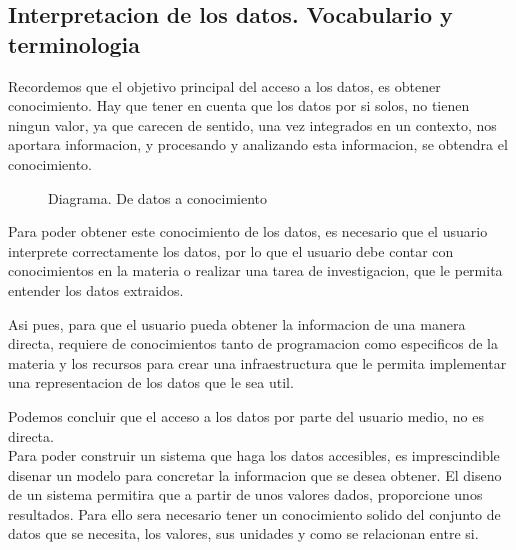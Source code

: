 \subsection{Interpretacion de los datos. Vocabulario y terminologia}

Recordemos que el objetivo principal del acceso a los datos, es obtener conocimiento. Hay que tener en 
cuenta que los datos por si solos, no tienen ningun valor, ya que carecen de sentido, una vez integrados en un contexto,
nos aportara informacion, y procesando y analizando esta informacion, se obtendra el conocimiento.\\
    
\begin{figure}[ht]
    \centering 
      \caption{Diagrama. De datos a conocimiento}
    \end{figure}
 
Para poder obtener este conocimiento de los datos, es necesario que el usuario interprete correctamente los datos, por lo
que el usuario debe contar con conocimientos en la materia o realizar una tarea de investigacion, que le permita 
entender los datos extraidos. 

Asi pues, para que el usuario pueda obtener la informacion de una manera directa, requiere de conocimientos tanto 
de programacion como especificos de la materia y los recursos para crear una infraestructura que le permita implementar 
una representacion de los datos que le sea util.

Podemos concluir que el acceso a los datos por parte del usuario medio, no es directa.\\

Para poder construir un sistema que haga los datos accesibles, es imprescindible disenar un modelo  para concretar la 
informacion que se desea obtener. El diseno de un sistema permitira que a partir de unos valores dados, proporcione unos resultados.
Para ello sera necesario tener un conocimiento solido del conjunto de datos que se necesita, los valores,
sus unidades y como se relacionan entre si.


